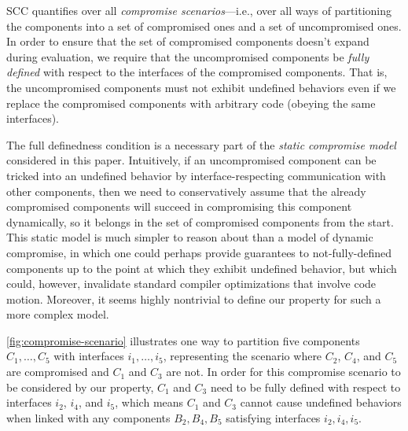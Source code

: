 \documentclass[10pt, conference, compsocconf, letterpaper, times]{IEEEtran}
\begin{document}
SCC quantifies over all {\em compromise
  scenarios}---i.e., over all ways of partitioning the components
into a set of compromised ones and a set of uncompromised ones.
In order to ensure that the set
  of compromised components doesn't expand during evaluation,
we require that the uncompromised components be {\em fully defined}
with respect to the interfaces of the compromised components.
That is, the uncompromised components must not exhibit undefined
behaviors
even if we replace the compromised components with arbitrary code (obeying
the same interfaces).



The full definedness condition is a necessary part of
the {\em static compromise model} considered in this paper.
Intuitively, if an uncompromised component can be tricked into an
undefined behavior by interface-respecting communication with other
components, then we need to conservatively assume that the already
compromised components will succeed in compromising this component
dynamically, so it belongs in the set of compromised components from
the start.
This static model is much simpler to reason about than a model of
dynamic compromise, in which one could perhaps provide guarantees to
not-fully-defined components up to the point at which they exhibit
undefined behavior, but which could, however, invalidate standard
compiler optimizations that involve code motion.
Moreover, it seems highly nontrivial to define our property for such a
more complex model.

\autoref{fig:compromise-scenario} illustrates one way to partition
five components $C_1,\dots,C_5$ with interfaces $i_1,\ldots,i_5$,
representing the scenario where $C_2$, $C_4$, and $C_5$ are
compromised and $C_1$ and $C_3$ are not.
In order for this compromise scenario to be considered by our property,
$C_1$ and $C_3$ need to be fully defined with respect to interfaces
$i_2$, $i_4$, and $i_5$, which means $C_1$ and $C_3$ cannot cause
undefined behaviors when linked with any components $B_2, B_4, B_5$
satisfying interfaces $i_2, i_4, i_5$.
\end{document}
